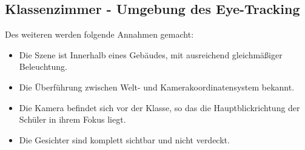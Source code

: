 \subsection{Klassenzimmer - Umgebung des Eye-Tracking}
Des weiteren werden folgende Annahmen gemacht:
\begin{itemize}
\item Die Szene ist Innerhalb eines Gebäudes, mit ausreichend gleichmäßiger Beleuchtung.
\item Die Überführung zwischen Welt- und Kamerakoordinatensystem bekannt.
\item Die Kamera befindet sich vor der Klasse, so das die Hauptblickrichtung der Schüler in ihrem Fokus liegt.
\item Die Gesichter sind komplett sichtbar und nicht verdeckt.
\end{itemize}